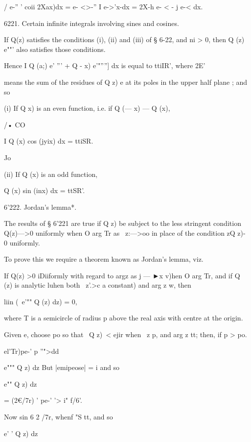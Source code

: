 / e-'' ' coii 2Xax)dx = e- <>-'' I e->'x-dx = 2X-h e- < - j e-< dx.

6221. Certain infinite integrals involving sines and cosines.

If Q(z) satisfies the conditions (i), (ii) and (iii) of § 6-22, and ni
> 0, then Q (z) e""' also satisfies those conditions.

%
%

Hence I Q (a;) e' ''' + Q - x) e'"''''] dx is equal to ttiIR', where
2E'

means the sum of the residues of Q z) e at its poles in the upper half
plane ; and so

(i) If Q x) is an even function, i.e. if Q (— x) — Q (x),

/• CO

I Q (x) cos (jyix) dx = ttiSR.

Jo

(ii) If Q (x) is an odd function,

Q (x) sin (inx) dx = ttSR'.



6'222. Jordan's lemma*.

The results of § 6'221 are true if Q z) be subject to the less
stringent condition Q(z)—>0 uniformly when O arg Tr as \ z:—>oo in
place of the condition zQ z)- 0 uniformly.

To prove this we require a theorem known as Jordan's lemma, viz.

If Q(z) >0 iDiiformly with regard to argz as j — ►x v)hen O arg Tr,
and if Q (z) is analytic luhen both \ z'.>c a constant) and arg z w,
then

liin (\ e'"" Q (z) dz) = 0,

where T is a semicircle of radius p above the real axis with centre at
the origin.

Given e, choose po so that \ Q z)\ < ejir when \ z p, and arg z tt;
then, if p > po.



 el'Tr)pe-' p ''">dd



e""" Q z) dz But |emipeose| = i and so

e"" Q z) dz



= (2€/7r) ' pe-' '> i" f/6'.



Now sin 6 2 /7r, whenf "S tt, and so



e' ' Q z) dz



